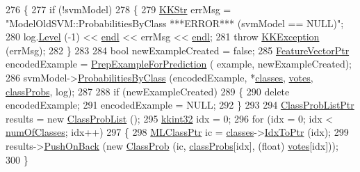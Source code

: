 \begin{DoxyCode}
276 \{
277   \textcolor{keywordflow}{if}  (!svmModel)
278   \{
279     \hyperlink{class_k_k_b_1_1_k_k_str}{KKStr}  errMsg = \textcolor{stringliteral}{"ModelOldSVM::ProbabilitiesByClass   ***ERROR***      (svmModel == NULL)"};
280     log.\hyperlink{class_k_k_b_1_1_run_log_a32cf761d7f2e747465fd80533fdbb659}{Level} (-1) << \hyperlink{namespace_k_k_b_ad1f50f65af6adc8fa9e6f62d007818a8}{endl} << errMsg << \hyperlink{namespace_k_k_b_ad1f50f65af6adc8fa9e6f62d007818a8}{endl};
281     \textcolor{keywordflow}{throw} \hyperlink{class_k_k_b_1_1_k_k_exception}{KKException} (errMsg);
282   \}
283 
284   \textcolor{keywordtype}{bool}  newExampleCreated = \textcolor{keyword}{false};
285   \hyperlink{class_k_k_m_l_l_1_1_feature_vector}{FeatureVectorPtr}  encodedExample = \hyperlink{class_k_k_m_l_l_1_1_model_old_s_v_m_a4a4acb48564e3597bea933aed21f8d79}{PrepExampleForPrediction} (
      example, newExampleCreated);
286   svmModel->\hyperlink{class_k_k_m_l_l_1_1_s_v_m_model_a1c5a892328e992f604e129d6d3f6bdca}{ProbabilitiesByClass} (encodedExample, *\hyperlink{class_k_k_m_l_l_1_1_model_a764e7680f07814c3c5313dc4e4de60a1}{classes}, 
      \hyperlink{class_k_k_m_l_l_1_1_model_a7d13e2ff97ace39ec4423fd4bfa9ecf2}{votes}, \hyperlink{class_k_k_m_l_l_1_1_model_a9d51bc464ab7049659aeea120bf9db26}{classProbs}, log);
287 
288   \textcolor{keywordflow}{if}  (newExampleCreated)
289   \{
290     \textcolor{keyword}{delete} encodedExample;
291     encodedExample = NULL;
292   \}
293   
294   \hyperlink{class_k_k_m_l_l_1_1_class_prob_list}{ClassProbListPtr}  results = \textcolor{keyword}{new} \hyperlink{class_k_k_m_l_l_1_1_class_prob_list}{ClassProbList} ();
295   \hyperlink{namespace_k_k_b_a8fa4952cc84fda1de4bec1fbdd8d5b1b}{kkint32} idx = 0;
296   \textcolor{keywordflow}{for}  (idx = 0;  idx < \hyperlink{class_k_k_m_l_l_1_1_model_ad41340e916a5ccdae7ed38d9546a8445}{numOfClasses};  idx++)
297   \{
298     \hyperlink{class_k_k_m_l_l_1_1_m_l_class}{MLClassPtr}  ic = \hyperlink{class_k_k_m_l_l_1_1_model_a764e7680f07814c3c5313dc4e4de60a1}{classes}->\hyperlink{class_k_k_b_1_1_k_k_queue_acce2bdd8b3327e38266cf198382cd852}{IdxToPtr} (idx);
299     results->\hyperlink{class_k_k_m_l_l_1_1_class_prob_list_a9fd88e9e49fd9b46142f1557d74e56ed}{PushOnBack} (\textcolor{keyword}{new} \hyperlink{class_k_k_m_l_l_1_1_class_prob}{ClassProb} (ic, \hyperlink{class_k_k_m_l_l_1_1_model_a9d51bc464ab7049659aeea120bf9db26}{classProbs}[idx], (\textcolor{keywordtype}{float})
      \hyperlink{class_k_k_m_l_l_1_1_model_a7d13e2ff97ace39ec4423fd4bfa9ecf2}{votes}[idx]));
300   \}

\end{DoxyCode}
